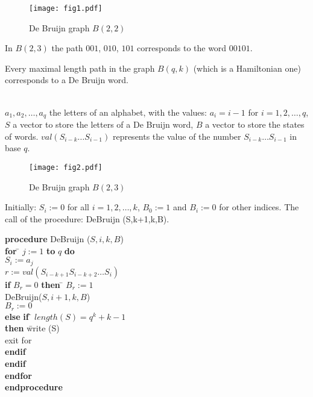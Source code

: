 \documentclass[10pt]{article}
\begin{document}
\begin{figure}[t]
\centering\texttt{[image: fig1.pdf]}
\label{br22}\caption{De Bruijn graph $B(2,2)$} 
\end{figure}



\medskip\noindent
In $B(2,3)$ the path {$001$, $010$, $101$} corresponds to the 
word {$00101$.}  

\medskip\noindent
Every maximal length path in the graph $B(q,k)$ (which is a
Hamiltonian one) corresponds to a De Bruijn word.      


\bigskip\noindent{\textcolor{red}{Algorithm to generate all De Bruijn words}}
\\
$a_1,a_2, \ldots, a_q$ the letters of an alphabet, with the values: $a_i=i-1$ for $i=1,2,\ldots ,q$, 
$S$ a vector to store the letters of a De Bruijn word, 
$B$ a vector to store the states of words.  $val(S_{i-k}\ldots  S_{i-1})$ represents the value of the number $S_{i-k}\ldots S_{i-1}$ in base  $q$. 

\begin{figure}[t]
\centering\texttt{[image: fig2.pdf]}
\label{br23}\caption{De Bruijn graph $B(2,3)$} 
\end{figure}

\medskip\noindent Initially: $S_i :=0$ for all $i=1,2,\ldots, k$, 
$B_0:=1$ and $B_i:=0$ for other indices. 
The call of the procedure: DeBruijn (S,k+1,k,B).

\begin{tabbing}
\textbf{{procedure}} DeBruijn ($S,i,k,B$)\\
\textbf{{for}} \= $j:=1$ \textbf{{to}} $q$ \textbf{{do}}\\
             \> $S_i := a_j$\\
             \>  $r := val(S_{i-k+1}S_{i-k+2} \ldots S_{i}) $\\
             \> \textbf{{if}} $B_r=0$ \=\textbf{{then}} \= $B_r:=1$\\
             \>                     \>              \> DeBruijn($S,i+1,k,B$)\\
             \>                     \>              \> $B_r:=0$\\
             \>                     \>\textbf{{else}} \= \textbf{{if}}  \=         $length(S)=q^k+k-1$\\ 
            \> \> \> \> \textbf{{then}} \= write (S)\\
             \> \> \> \>                                           \>  exit for\\
             \>         \>            \>               \> \textbf{{endif}}  \\          
             \> \textbf{{endif}}\\
\textbf{{endfor}} \\
\textbf{{endprocedure}}            
\end{tabbing}
\end{document}
